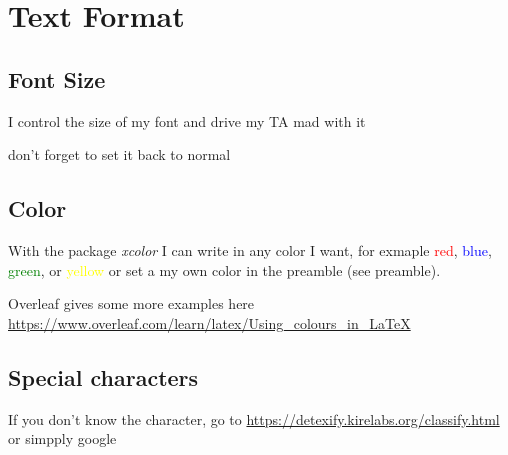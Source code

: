\documentclass[12pt]{article}
\begin{document}


\section{Text Format}

\subsection{Font Size}

\tiny I  
\scriptsize control  
\footnotesize the size 
\small of my
\normalsize font
\large and drive 
\Large my TA
\LARGE mad  
\huge with  
\Huge{it}

\normalsize don't forget to set it back to normal


\subsection{Color}\label{color}
With the package \textit{xcolor} I can write in any color I want, for exmaple 
\textcolor{red}{red},
\textcolor{blue}{blue},
\textcolor{green}{green}, or
\textcolor{yellow}{yellow} or set a 
\textcolor{mypink3}{my own color}
\textcolor{prettyorange}{in the preamble (see preamble)}.

Overleaf gives some more examples here \url{https://www.overleaf.com/learn/latex/Using_colours_in_LaTeX}

\subsection{Special characters}
If you don't know the character, go to
\url{https://detexify.kirelabs.org/classify.html} or simpply google
\end{document}
